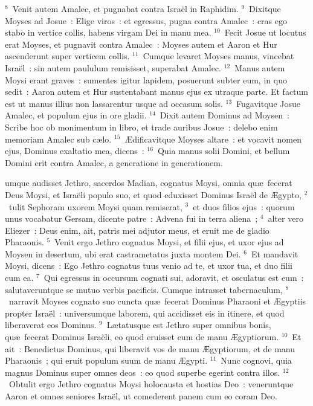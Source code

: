 ${}^{8}$~Venit autem Amalec, et pugnabat contra Isra\"el in Raphidim.
${}^{9}$~Dixitque Moyses ad Josue~: Elige viros~: et egressus, pugna contra Amalec~: cras ego stabo in vertice collis, habens virgam Dei in manu mea.
${}^{10}$~Fecit Josue ut locutus erat Moyses, et pugnavit contra Amalec~: Moyses autem et Aaron et Hur ascenderunt super verticem collis.
${}^{11}$~Cumque levaret Moyses manus, vincebat Isra\"el~: sin autem paululum remisisset, superabat Amalec.
${}^{12}$~Manus autem Moysi erant graves~: sumentes igitur lapidem, posuerunt subter eum, in quo sedit~: Aaron autem et Hur sustentabant manus ejus ex utraque parte. Et factum est ut manus illius non lassarentur usque ad occasum solis.
${}^{13}$~Fugavitque Josue Amalec, et populum ejus in ore gladii.
${}^{14}$~Dixit autem Dominus ad Moysen~: Scribe hoc ob monimentum in libro, et trade auribus Josue~: delebo enim memoriam Amalec sub c\ae lo.
${}^{15}$~\AE dificavitque Moyses altare~: et vocavit nomen ejus, Dominus exaltatio mea, dicens~:
${}^{16}$~Quia manus solii Domini, et bellum Domini erit contra Amalec, a generatione in generationem.

\bchapter
{}umque audisset Jethro, sacerdos Madian, cognatus Moysi, omnia qu\ae\ fecerat Deus Moysi, et Isra\"eli populo suo, et quod eduxisset Dominus Isra\"el de \AE gypto,
${}^{2}$~tulit Sephoram uxorem Moysi quam remiserat,
${}^{3}$~et duos filios ejus~: quorum unus vocabatur Gersam, dicente patre~: Advena fui in terra aliena~;
${}^{4}$~alter vero Eliezer~: Deus enim, ait, patris mei adjutor meus, et eruit me de gladio Pharaonis.
${}^{5}$~Venit ergo Jethro cognatus Moysi, et filii ejus, et uxor ejus ad Moysen in desertum, ubi erat castrametatus juxta montem Dei.
${}^{6}$~Et mandavit Moysi, dicens~: Ego Jethro cognatus tuus venio ad te, et uxor tua, et duo filii cum ea.
${}^{7}$~Qui egressus in occursum cognati sui, adoravit, et osculatus est eum~: salutaveruntque se mutuo verbis pacificis. Cumque intrasset tabernaculum,
${}^{8}$~narravit Moyses cognato suo cuncta qu\ae\ fecerat Dominus Pharaoni et \AE gyptiis propter Isra\"el~: universumque laborem, qui accidisset eis in itinere, et quod liberaverat eos Dominus.
${}^{9}$~L\ae tatusque est Jethro super omnibus bonis, qu\ae\ fecerat Dominus Isra\"eli, eo quod eruisset eum de manu \AE gyptiorum.
${}^{10}$~Et ait~: Benedictus Dominus, qui liberavit vos de manu \AE gyptiorum, et de manu Pharaonis~; qui eruit populum suum de manu \AE gypti.
${}^{11}$~Nunc cognovi, quia magnus Dominus super omnes deos~: eo quod superbe egerint contra illos.
${}^{12}$~Obtulit ergo Jethro cognatus Moysi holocausta et hostias Deo~: veneruntque Aaron et omnes seniores Isra\"el, ut comederent panem cum eo coram Deo.


